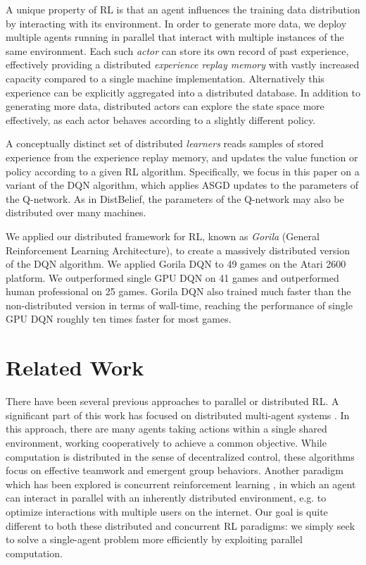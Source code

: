 \documentclass{article}
\begin{document}
A unique property of RL is that an agent influences the training data distribution by interacting with its environment. In order to generate more data, we deploy multiple agents running in parallel that interact with multiple instances of the same environment. Each such \emph{actor} can store its own record of past experience, effectively providing a distributed \emph{experience replay memory} with vastly increased capacity compared to a single machine implementation. Alternatively this experience can be explicitly aggregated into a distributed database. In addition to generating more data, distributed actors can explore the state space more effectively, as each actor behaves according to a slightly different policy. 

A conceptually distinct set of distributed \emph{learners} reads samples of stored experience from the experience replay memory, and updates the value function or policy according to a given RL algorithm. Specifically, we focus in this paper on a variant of the DQN algorithm, which applies ASGD updates to the parameters of the Q-network. As in DistBelief, the parameters of the Q-network may also be distributed over many machines.

We applied our distributed framework for RL, known as \emph{Gorila} (General Reinforcement Learning Architecture), to create a massively distributed version of the DQN algorithm. We applied Gorila DQN to 49 games on the Atari 2600 platform. We outperformed single GPU DQN on 41 games and outperformed human professional on 25 games. Gorila DQN also trained much faster than the non-distributed version in terms of wall-time, reaching the performance of single GPU DQN roughly ten times faster for most games.


 \section{Related Work}

There have been several previous approaches to parallel or distributed RL. A significant part of this work has focused on distributed multi-agent systems \cite{weiss:distributedRL,lauer:distributedRL}. In this approach, there are many agents taking actions within a single shared environment, working cooperatively to achieve a common objective. While computation is distributed in the sense of decentralized control, these algorithms focus on effective teamwork and emergent group behaviors. Another paradigm which has been explored is concurrent reinforcement learning \cite{silver:concurrentRL}, in which an agent can interact in parallel with an inherently distributed environment, e.g. to optimize interactions with multiple users on the internet. Our goal is quite different to both these distributed and concurrent RL paradigms: we simply seek to solve a single-agent problem more efficiently by exploiting parallel computation. 
\end{document}
